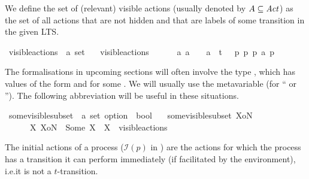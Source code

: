 \begin{isabellebody}
%
\begin{isamarkuptext}%
We define the set of (relevant) visible actions (usually denoted by $A \subseteq \mathit{Act}$) as the set of all actions that are not hidden and that are labels of some transition in the given LTS.%
\end{isamarkuptext}\isamarkuptrue%
\isamarkupfalse%
\ visible{\isacharunderscore}{\kern0pt}actions\ {\isacharcolon}{\kern0pt}{\isacharcolon}{\kern0pt}\ {\isacartoucheopen}{\isacharprime}{\kern0pt}a\ set{\isacartoucheclose}\isanewline
\ \ \ {\isacartoucheopen}visible{\isacharunderscore}{\kern0pt}actions\ \isanewline
\ \ \ \ {\isasymequiv}\ {\isacharbraceleft}{\kern0pt}a{\isachardot}{\kern0pt}\ {\isacharparenleft}{\kern0pt}a\ {\isasymnoteq}\ {\isasymtau}{\isacharparenright}{\kern0pt}\ {\isasymand}\ {\isacharparenleft}{\kern0pt}a\ {\isasymnoteq}\ t{\isacharparenright}{\kern0pt}\ {\isasymand}\ {\isacharparenleft}{\kern0pt}{\isasymexists}\ p\ p{\isacharprime}{\kern0pt}{\isachardot}{\kern0pt}\ p\ {\isasymlongmapsto}a\ p{\isacharprime}{\kern0pt}{\isacharparenright}{\kern0pt}{\isacharbraceright}{\kern0pt}{\isacartoucheclose}%
\begin{isamarkuptext}%
The formalisations in upcoming sections will often involve the type , which has values of the form  and  for some . We will usually use the metavariable  (for \enquote{ or }). The following abbreviation will be useful in these situations.%
\end{isamarkuptext}\isamarkuptrue%
\isamarkupfalse%
\ some{\isacharunderscore}{\kern0pt}visible{\isacharunderscore}{\kern0pt}subset\ {\isacharcolon}{\kern0pt}{\isacharcolon}{\kern0pt}\ {\isacartoucheopen}{\isacharprime}{\kern0pt}a\ set\ option\ {\isasymRightarrow}\ bool{\isacartoucheclose}\isanewline
\ \ \ {\isacartoucheopen}some{\isacharunderscore}{\kern0pt}visible{\isacharunderscore}{\kern0pt}subset\ XoN\ \isanewline
\ \ \ \ {\isasymequiv}\ {\isasymexists}\ X{\isachardot}{\kern0pt}\ XoN\ {\isacharequal}{\kern0pt}\ Some\ X\ {\isasymand}\ X\ {\isasymsubseteq}\ visible{\isacharunderscore}{\kern0pt}actions{\isacartoucheclose}%
\begin{isamarkuptext}%
The initial actions of a process ($\mathcal{I}(p)$ in \cite{rbs}) are the actions for which the process has a transition it can perform immediately (if facilitated by the environment), i.e.\@ it is not a $t$-transition.%

\end{isamarkuptext}
\end{isabellebody}
